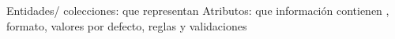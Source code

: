 Entidades/ colecciones: que representan
Atributos: que información contienen , formato, valores por defecto, reglas y validaciones